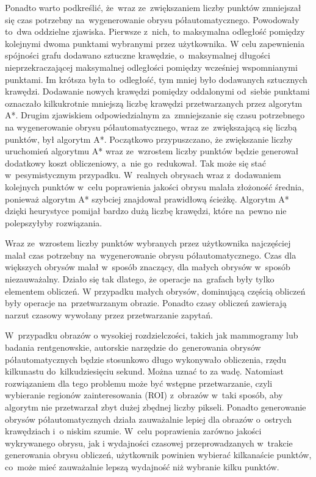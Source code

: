 \documentclass[a4paper,11pt,twoside,openright]{report}
\theoremstyle{definition}
\begin{document}
Ponadto warto podkreślić, że~wraz
ze~zwiększaniem liczby punktów zmniejszał się czas potrzebny na~wygenerowanie
obrysu półautomatycznego. Powodowały to~dwa oddzielne zjawiska. Pierwsze z~nich, to
maksymalna odległość pomiędzy kolejnymi dwoma punktami wybranymi przez użytkownika.
W celu zapewnienia spójności grafu dodawano sztuczne krawędzie, o~maksymalnej długości
nieprzekraczającej maksymalnej odległości pomiędzy wcześniej wspomnianymi punktami.
Im krótsza była to~odległość, tym mniej było dodawanych sztucznych krawędzi.
Dodawanie nowych krawędzi pomiędzy oddalonymi od~siebie punktami oznaczało
kilkukrotnie mniejszą liczbę krawędzi przetwarzanych przez algorytm
A*. Drugim zjawiskiem odpowiedzialnym za~zmniejszanie się czasu potrzebnego na
wygenerowanie obrysu półautomatycznego, wraz ze~zwiększającą się liczbą punktów,
był algorytm A*. Początkowo przypuszczano, że zwiększanie liczby uruchomień algorytmu
A* wraz ze~wzrostem liczby punktów będzie generował dodatkowy koszt obliczeniowy,
a~nie go~redukował. Tak może się stać w~pesymistycznym przypadku. W~realnych
obrysach wraz z~dodawaniem kolejnych punktów w~celu poprawienia jakości obrysu
malała złożoność średnia, ponieważ algorytm A* szybciej znajdował prawidłową
ścieżkę. Algorytm A* dzięki heurystyce pomijał bardzo dużą liczbę krawędzi,
które na~pewno nie polepszyłyby rozwiązania.

Wraz ze~wzrostem liczby punktów wybranych przez użytkownika najczęściej malał
czas potrzebny na~wygenerowanie obrysu półautomatycznego. Czas dla większych
obrysów malał w~sposób znaczący, dla małych obrysów w~sposób niezauważalny.
Działo się tak dlatego, że operacje na~grafach były tylko elementem obliczeń. W
przypadku małych obrysów, dominującą częścią obliczeń były operacje na~przetwarzanym
obrazie. Ponadto czasy obliczeń zawierają narzut czasowy wywołany przez
przetwarzanie zapytań.

W~przypadku obrazów o wysokiej rozdzielczości, takich jak mammogramy lub badania
rentgenowskie, autorskie narzędzie do~generowania obrysów półautomatycznych
będzie stosunkowo długo wykonywało obliczenia, rzędu kilkunastu do~kilkudziesięciu
sekund. Można uznać to za wadę. Natomiast rozwiązaniem dla tego problemu może być
wstępne przetwarzanie, czyli wybieranie regionów zainteresowania (ROI)
z~obrazów
w~taki sposób, aby algorytm nie przetwarzał zbyt dużej zbędnej liczby pikseli.
Ponadto generowanie obrysów
półautomatycznych działa zauważalnie lepiej dla obrazów o~ostrych krawędziach i~o
niskim szumie. W~celu poprawienia zarówno jakości wykrywanego obrysu, jak i
wydajności czasowej przeprowadzanych w~trakcie generowania obrysu obliczeń, użytkownik
powinien wybierać kilkanaście punktów, co~może mieć zauważalnie
lepszą wydajność niż wybranie kilku punktów.
\end{document}
